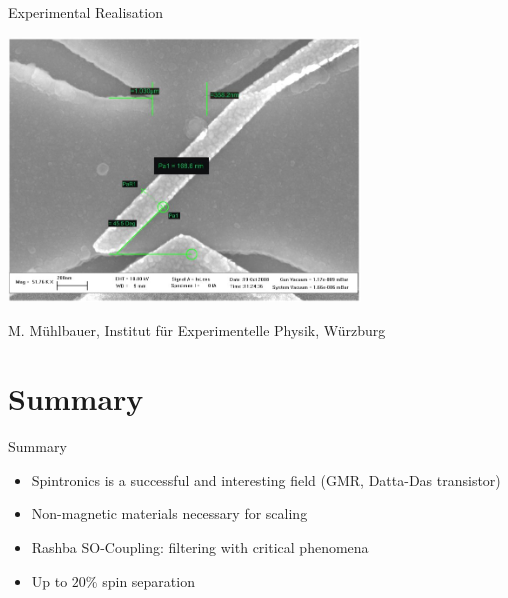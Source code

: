 \documentclass{beamer}
\begin{document}
\begin{frame}{Experimental Realisation}
    \begin{center}
        \includegraphics[width=0.7\textwidth]{beamsplitter2.jpg}

        M. Mühlbauer, Institut für Experimentelle Physik, Würzburg
    \end{center}
\end{frame}

\section{Summary}

\begin{frame}{Summary}
    \begin{itemize}
        \item Spintronics is a successful and interesting field (GMR,
            Datta-Das transistor)
        \item Non-magnetic materials necessary for scaling
        \item Rashba SO-Coupling: filtering with critical phenomena
        \item Up to $20\%$ spin separation
    \end{itemize}

\end{frame}
\end{document}
